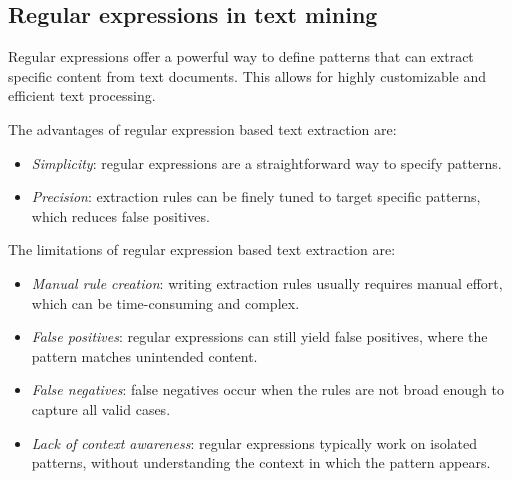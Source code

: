 \renewcommand{\arraystretch}{1}
    
\subsection{Regular expressions in text mining}
Regular expressions offer a powerful way to define patterns that can extract specific content from text documents. 
This allows for highly customizable and efficient text processing.

\noindent The advantages of regular expression based text extraction are: 
\begin{itemize}
    \item \textit{Simplicity}: regular expressions are a straightforward way to specify patterns.
    \item \textit{Precision}: extraction rules can be finely tuned to target specific patterns, which reduces false positives.
\end{itemize}
\noindent The limitations of regular expression based text extraction are: 
\begin{itemize}
    \item \textit{Manual rule creation}: writing extraction rules usually requires manual effort, which can be time-consuming and complex.
    \item \textit{False positives}: regular expressions can still yield false positives, where the pattern matches unintended content. 
    \item \textit{False negatives}: false negatives occur when the rules are not broad enough to capture all valid cases.
    \item \textit{Lack of context awareness}: regular expressions typically work on isolated patterns, without understanding the context in which the pattern appears.
\end{itemize}